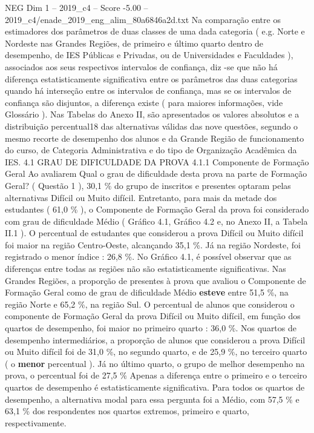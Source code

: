 \begin{textsample}{NEG Dim 1 – 2019\_c4 – Score -5.00 – 2019\_c4/enade\_2019\_eng\_alim\_80a6846a2d.txt}
Na comparação entre os estimadores dos parâmetros de duas classes de uma dada categoria ( e.g.
Norte e Nordeste nas Grandes Regiões, de primeiro e último quarto dentro de desempenho, de IES Públicas e Privadas, ou de Universidades e Faculdades ), associados aos seus respectivos intervalos de confiança, diz -se que não há diferença estatisticamente significativa entre os parâmetros das duas categorias quando há interseção entre os intervalos de confiança, mas se os intervalos de confiança são disjuntos, a diferença existe ( para maiores informações, vide Glossário ).
Nas Tabelas do Anexo II, são apresentados os valores absolutos e a distribuição percentual18 das alternativas válidas das nove questões, segundo o mesmo recorte de desempenho dos alunos e da Grande Região de funcionamento do curso, de Categoria Administrativa e do tipo de Organização Acadêmica da IES. 4.1 GRAU DE DIFICULDADE DA PROVA 4.1.1 Componente de Formação Geral Ao avaliarem Qual o grau de dificuldade desta prova na parte de Formação Geral? ( Questão 1 ), 30,1 \% do grupo de inscritos e presentes optaram pelas alternativas Difícil ou Muito difícil.
Entretanto, para mais da metade dos estudantes ( 61,0 \% ), o Componente de Formação Geral da prova foi considerado com grau de dificuldade Médio ( Gráfico 4.1, Gráfico 4.2 e, no Anexo II, a Tabela II.1 ).
O percentual de estudantes que considerou a prova Difícil ou Muito difícil foi maior na região Centro-Oeste, alcançando 35,1 \%.
Já na região Nordeste, foi registrado o menor índice : 26,8 \%.
No Gráfico 4.1, é possível observar que as diferenças entre todas as regiões não são estatisticamente significativas.
Nas Grandes Regiões, a proporção de presentes à prova que avaliou o Componente de Formação Geral como de grau de dificuldade Médio \textbf{esteve} entre 51,5 \%, na região Norte e 65,2 \%, na região Sul.
O percentual de alunos que considerou o componente de Formação Geral da prova Difícil ou Muito difícil, em função dos quartos de desempenho, foi maior no primeiro quarto : 36,0 \%.
Nos quartos de desempenho intermediários, a proporção de alunos que considerou a prova Difícil ou Muito difícil foi de 31,0 \%, no segundo quarto, e de 25,9 \%, no terceiro quarto ( o \textbf{menor} percentual ).
Já no último quarto, o grupo de melhor desempenho na prova, o percentual foi de 27,5 \% Apenas a diferença entre o primeiro e o terceiro quartos de desempenho é estatisticamente significativa.
Para todos os quartos de desempenho, a alternativa modal para essa pergunta foi a Médio, com 57,5 \% e 63,1 \% dos respondentes nos quartos extremos, primeiro e quarto, respectivamente.

\end{textsample}
